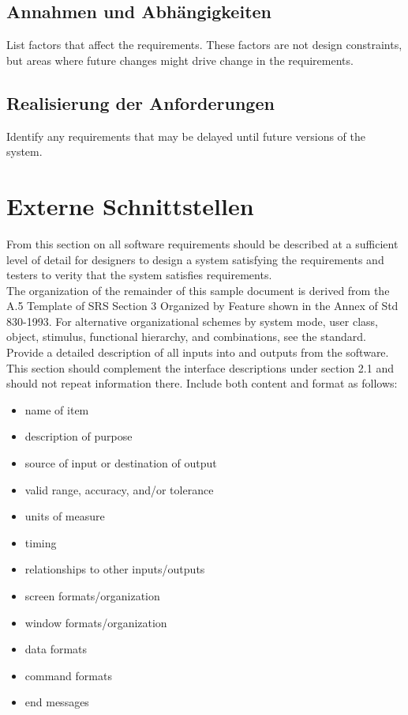 \subsection{Annahmen und Abhängigkeiten}
List factors that affect the requirements. These factors are not design constraints, but areas where future changes might drive change in the requirements.

\subsection{Realisierung der Anforderungen}
Identify any requirements that may be delayed until future versions of the system.

\newpage

\section{Externe Schnittstellen}
From this section on all software requirements should be described at a sufficient level of detail for designers to design a system satisfying the requirements and testers to verity that the system satisfies requirements. \\[-0.3cm]

\noindent The organization of the remainder of this sample document is derived from the A.5 Template of SRS Section 3 Organized by Feature shown in the Annex of Std 830-1993. For alternative organizational schemes by system mode, user class, object, stimulus, functional hierarchy, and combinations, see the standard. \\[-0.3cm]

\noindent Provide a detailed description of all inputs into and outputs from the software. This section should complement the interface descriptions under section 2.1 and should not repeat information there. Include both content and format as follows:
\begin{itemize}
	\item name of item
	\item description of purpose
	\item source of input or destination of output
	\item valid range, accuracy, and/or tolerance
	\item units of measure
	\item timing
	\item relationships to other inputs/outputs
	\item screen formats/organization
	\item window formats/organization
	\item data formats
	\item command formats
	\item end messages
\end{itemize}

